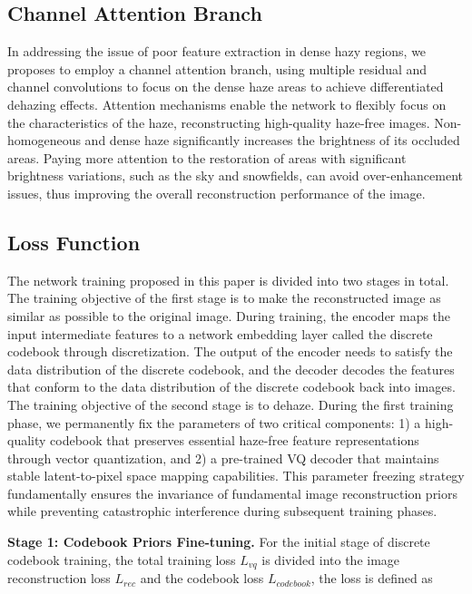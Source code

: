 \documentclass[journal]{IEEEtran}
\begin{document}
\subsection{Channel Attention Branch}
In addressing the issue of poor feature extraction in dense hazy regions, we proposes to employ a channel attention branch, using multiple residual and channel convolutions to focus on the dense haze areas to achieve differentiated dehazing effects.
Attention mechanisms enable the network to flexibly focus on the characteristics of the haze, reconstructing high-quality haze-free images. Non-homogeneous and dense haze significantly increases the brightness of its occluded areas. Paying more attention to the restoration of areas with significant brightness variations, such as the sky and snowfields, can avoid over-enhancement issues, thus improving the overall reconstruction performance of the image.

\subsection{Loss Function}

The network training proposed in this paper is divided into two stages in total. The training objective of the first stage is to make the reconstructed image as similar as possible to the original image. During training, the encoder maps the input intermediate features to a network embedding layer called the discrete codebook through discretization. The output of the encoder needs to satisfy the data distribution of the discrete codebook, and the decoder decodes the features that conform to the data distribution of the discrete codebook back into images. The training objective of the second stage is to dehaze. During the first training phase, we permanently fix the parameters of two critical components: 1) a high-quality codebook that preserves essential haze-free feature representations through vector quantization, and 2) a pre-trained VQ decoder that maintains stable latent-to-pixel space mapping capabilities. This parameter freezing strategy fundamentally ensures the invariance of fundamental image reconstruction priors while preventing catastrophic interference during subsequent training phases.

	{\bf{Stage 1: Codebook Priors Fine-tuning.}} For the initial stage of discrete codebook training, the total training loss $L_{vq}$ is divided into the image reconstruction loss $L_{rec}$ and the codebook loss $L_{codebook}$, the loss is defined as
\end{document}
